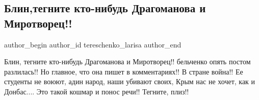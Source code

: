  
 
 
 
 
 
\subsection{Блин,тегните кто-нибудь Драгоманова и Миротворец!!}
\label{sec:29_08_2021.fb.tereschenko_larisa.1.bilchenko_mirotvorec}
 
\ifcmt
 author_begin
   author_id tereschenko_larisa
 author_end
\fi

\obeycr
Блин, тегните кто-нибудь Драгоманова и Миротворец!!
бельченко опять постом разлилась!!
Но главное, что она пишет в комментариях!!
В стране война!!
Ее студенты не воюют, адин народ, наши убивают своих, Крым нас не хочет, как и Донбас....
Это такой кошмар и понос речи!!
Тегните, плиз!!
\restorecr
